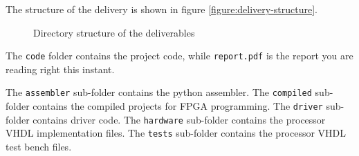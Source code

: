 The structure of the delivery is shown in figure \vref{figure:delivery-structure}.

\begin{center}
\begin{figure}[H]
\caption{Directory structure of the deliverables}
\label{figure:delivery-structure}
\end{figure}
\end{center}

The \texttt{code} folder contains the project code, while \texttt{report.pdf} is the report you are reading right this instant.	

The \texttt{assembler} sub-folder contains the python assembler.
The \texttt{compiled} sub-folder contains the compiled projects for FPGA programming.
The \texttt{driver} sub-folder contains driver code.
The \texttt{hardware} sub-folder contains the processor VHDL implementation files.
The \texttt{tests} sub-folder contains the processor VHDL test bench files.
